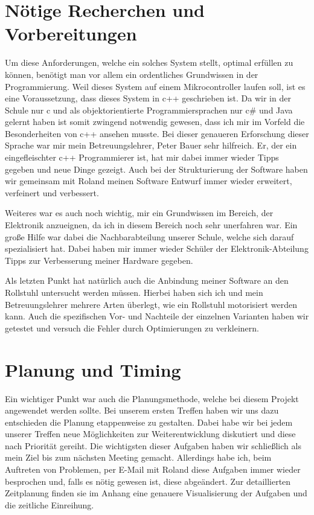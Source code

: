 \section{Nötige Recherchen und Vorbereitungen}
Um diese Anforderungen, welche ein solches System stellt, optimal erfüllen zu können, benötigt man vor allem ein ordentliches Grundwissen in der Programmierung.
Weil dieses System auf einem Mikrocontroller laufen soll, ist es eine Voraussetzung, dass dieses System in c++ geschrieben ist.
Da wir in der Schule nur c und als objektorientierte Programmiersprachen nur c\# und Java gelernt haben ist somit zwingend notwendig gewesen, dass ich mir im Vorfeld die Besonderheiten von c++ ansehen musste.
Bei dieser genaueren Erforschung dieser Sprache war mir mein Betreuungslehrer, Peter Bauer sehr hilfreich.
Er, der ein eingefleischter c++ Programmierer ist, hat mir dabei immer wieder Tipps gegeben und neue Dinge gezeigt.
Auch bei der Strukturierung der Software haben wir gemeinsam mit Roland meinen Software Entwurf immer wieder erweitert, verfeinert und verbessert.

Weiteres war es auch noch wichtig, mir ein Grundwissen im Bereich, der Elektronik anzueignen, da ich in diesem Bereich noch sehr unerfahren war.
Ein große Hilfe war dabei die Nachbarabteilung unserer Schule, welche sich darauf spezialisiert hat.
Dabei haben mir immer wieder Schüler der Elektronik-Abteilung Tipps zur Verbesserung meiner Hardware gegeben.

Als letzten Punkt hat natürlich auch die Anbindung meiner Software an den Rollstuhl untersucht werden müssen.
Hierbei haben sich ich und mein Betreuungslehrer mehrere Arten überlegt, wie ein Rollstuhl motorisiert werden kann.
Auch die spezifischen Vor- und Nachteile der einzelnen Varianten haben wir getestet und versuch die Fehler durch Optimierungen zu verkleinern.


\section{Planung und Timing}
Ein wichtiger Punkt war auch die Planungsmethode, welche bei diesem Projekt angewendet werden sollte.
Bei unserem ersten Treffen haben wir uns dazu entschieden die Planung etappenweise zu gestalten.
Dabei habe wir bei jedem unserer Treffen neue Möglichkeiten zur Weiterentwicklung diskutiert und diese nach Priorität gereiht.
Die wichtigsten dieser Aufgaben haben wir schließlich als mein Ziel bis zum nächsten Meeting gemacht.
Allerdings habe ich, beim Auftreten von Problemen, per E-Mail mit Roland diese Aufgaben immer wieder besprochen und, falls es nötig gewesen ist, diese abgeändert.
Zur detaillierten Zeitplanung finden sie im Anhang eine genauere Visualisierung der Aufgaben und die zeitliche Einreihung.


